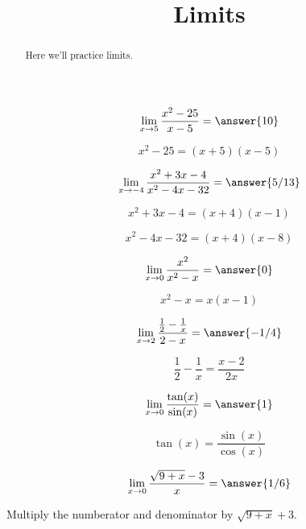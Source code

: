 \documentclass[handout]{ximera}
\title[Exercises:]{Limits}
\begin{document}
\begin{abstract}
  Here we'll practice limits.
\end{abstract}
\maketitle

\begin{exercise}
\[\lim_{x \to 5} \frac{x^2-25}{x-5} = \answer{10}\]
\begin{hint}
	\[x^2-25 = (x+5)(x-5)\]
\end{hint}
\end{exercise}


\begin{exercise}
\[\lim_{x \to -4} \frac{x^2+3x-4}{x^2-4x-32} = \answer{5/13}\]
\begin{hint}
	\[x^2+3x-4 = (x+4)(x-1)\]
\end{hint}
\begin{hint}
	\[x^2-4x-32 = (x+4)(x-8)\]
\end{hint}
\end{exercise}

\begin{exercise}
\[\lim_{x \to 0} \frac{x^2}{x^2-x} = \answer{0}\]
\begin{hint}
	\[x^2-x = x(x-1)\]
\end{hint}

\end{exercise}

\begin{exercise}
\[\lim_{x \to 2} \frac{\frac{1}{2}-\frac{1}{x}}{2-x} = \answer{-1/4}\]
\begin{hint}
	\[\frac{1}{2}-\frac{1}{x} = \frac{x-2}{2x}\]
\end{hint}
\end{exercise}

\begin{exercise}
\[\lim_{x \to 0} \frac{\tan(x)}{\sin(x)} = \answer{1}\]
\begin{hint}
	\[\tan(x) = \frac{\sin(x)}{\cos(x)}\]
\end{hint}
\end{exercise}

\begin{exercise}
\[\lim_{x \to 0} \frac{\sqrt{9+x}-3}{x} = \answer{1/6}\]
\begin{hint}
	Multiply the numberator and denominator by $\sqrt{9+x}+3$.
\end{hint}
\end{exercise}
\end{document}
